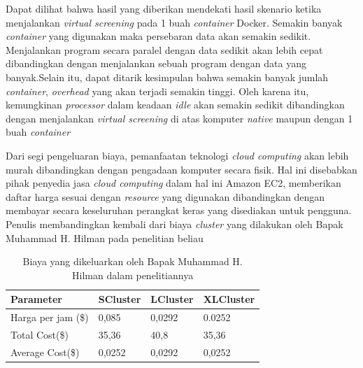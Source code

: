Dapat dilihat bahwa hasil yang diberikan mendekati hasil skenario ketika menjalankan \textit{virtual screening} pada 1 buah \textit{container} Docker. Semakin banyak \textit{container} yang digunakan maka persebaran data akan semakin sedikit. Menjalankan program secara paralel dengan data sedikit akan lebih cepat dibandingkan dengan menjalankan sebuah program dengan data yang banyak.Selain itu, dapat ditarik kesimpulan bahwa semakin banyak jumlah \textit{container}, \textit{overhead} yang akan terjadi semakin tinggi. Oleh karena itu, kemungkinan \textit{processor} dalam keadaan \textit{idle} akan semakin sedikit dibandingkan dengan menjalankan \textit{virtual screening} di atas komputer \textit{native} maupun dengan 1 buah \textit{container}

Dari segi pengeluaran biaya, pemanfaatan teknologi \textit{cloud computing} akan lebih murah dibandingkan dengan pengadaan komputer secara fisik. Hal ini disebabkan pihak penyedia jasa \textit{cloud computing} dalam hal ini Amazon EC2, memberikan daftar harga sesuai dengan \textit{resource} yang digunakan dibandingkan dengan membayar secara keseluruhan perangkat keras yang disediakan untuk pengguna. Penulis membandingkan kembali dari biaya \textit{cluster} yang dilakukan oleh Bapak Muhammad H. Hilman pada penelitian beliau \cite{cloud_pak hilman}
\begin{table}
	\centering
	\begin{tabular}{|l|l|l|l|}
		\hline
		Parameter & SCluster & LCluster & XLCluster \\ \hline
		Harga per jam (\$) & 0,085 & 0,0292 & 0.0252 \\ \hline
		Total Cost(\$) & 35,36 & 40,8 & 35,36 \\ \hline
		Average Cost(\$) & 0,0252 & 0,0292 & 0,0252 \\ \hline
	\end{tabular}
	\caption{Biaya yang dikeluarkan oleh Bapak Muhammad H. Hilman dalam penelitiannya \cite{cloud_pak hilman}}
	\label{my-label}
\end{table}

